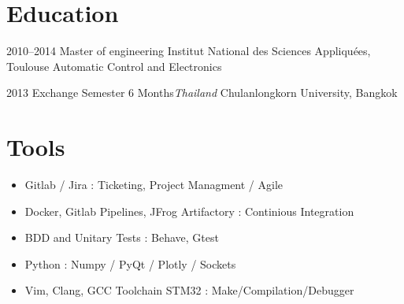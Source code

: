 \documentclass[a4paper]{friggeri-cv} %
\begin{document}
\section{Education}
\begin{entrylist}

 \entry
{2010--2014}
{Master of engineering}
{Institut National des Sciences Appliquées, Toulouse}
{Automatic Control and Electronics}


\entry
{2013}
{Exchange Semester 6 Months\textit{Thailand}}
{Chulanlongkorn University, Bangkok}
{}



\end{entrylist}



\section{Tools}

\begin{itemize}
\item Gitlab / Jira : Ticketing, Project Managment / Agile 
\item Docker, Gitlab Pipelines, JFrog Artifactory :  Continious Integration
\item BDD and Unitary Tests : Behave, Gtest
\item Python : Numpy / PyQt / Plotly / Sockets
\item Vim, Clang, GCC Toolchain STM32 : Make/Compilation/Debugger
\end{itemize}



\end{document}
